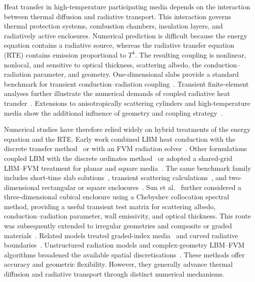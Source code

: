 \documentclass[a4paper,12pt]{ctexart}
\numberwithin{equation}{section}
\begin{document}
Heat transfer in high-temperature participating media depends on the interaction between thermal diffusion and radiative transport. This interaction governs thermal protection systems, combustion chambers, insulation layers, and radiatively active enclosures. Numerical prediction is difficult because the energy equation contains a radiative source, whereas the radiative transfer equation (RTE) contains emission proportional to $T^4$. The resulting coupling is nonlinear, nonlocal, and sensitive to optical thickness, scattering albedo, the conduction--radiation parameter, and geometry. One-dimensional slabs provide a standard benchmark for transient conduction--radiation coupling~\cite{Talukdar2001}. Transient finite-element analyses further illustrate the numerical demands of coupled radiative heat transfer~\cite{Feng2021}. Extensions to anisotropically scattering cylinders and high-temperature media show the additional influence of geometry and coupling strategy~\cite{YasongSun2021,Zhu2024}.

Numerical studies have therefore relied widely on hybrid treatments of the energy equation and the RTE. Early work combined LBM heat conduction with the discrete transfer method~\cite{MishraLankadasu2005} or with an FVM radiation solver~\cite{MishraRoy2007}. Other formulations coupled LBM with the discrete ordinates method~\cite{MondalMishra2007} or adopted a shared-grid LBM--FVM treatment for planar and square media~\cite{Sun2016}. The same benchmark family includes short-time slab solutions~\cite{Sutton1986}, transient scattering calculations~\cite{LinTsai1990}, and two-dimensional rectangular or square enclosures~\cite{YuenTakara1988,WuOu1994}. Sun et al.~\cite{SunMaLi2012} further considered a three-dimensional cubical enclosure using a Chebyshev collocation spectral method, providing a useful transient test matrix for scattering albedo, conduction--radiation parameter, wall emissivity, and optical thickness. This route was subsequently extended to irregular geometries and composite or graded materials~\cite{Abaszadeh2022,Tong2022}. Related models treated graded-index media~\cite{Wei2023} and curved radiative boundaries~\cite{Sharifi2023}. Unstructured radiation models and complex-geometry LBM--FVM algorithms broadened the available spatial discretisations~\cite{Liu2024,Miao2025}. These methods offer accuracy and geometric flexibility. However, they generally advance thermal diffusion and radiative transport through distinct numerical mechanisms.
\end{document}
